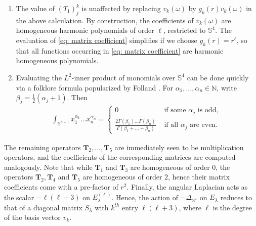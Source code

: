 \documentclass[11pt,reqno]{amsart}
\theoremstyle{remark}
\theoremstyle{definition}
\begin{document}
\begin{enumerate}
    \item The value of $(T_1)^k_j $ is unaffected by replacing $v_k(\omega)$ by $g_k(r) v_k(\omega)$ in the above calculation. By construction, the coefficients of $v_k(\omega)$ are homogeneous harmonic polynomials of order $\ell$, restricted to $\mathbb S^4$. The evaluation of \eqref{eq: matrix coefficient} simplifies if we choose $g_k(r) = r^\ell$, so that all functions occurring in \eqref{eq: matrix coefficient} are harmonic homogeneous polynomials.
    \item Evaluating the $L^2$-inner product of monomials over $\mathbb S^4$ can be done quickly via a folklore formula popularized by Folland \cite{Folland2001}. For $\alpha_1,\ldots,\alpha_n \in \mathbb N$, write $\beta_j = \frac{1}{2}(\alpha_j + 1)$. Then
    \begin{align*}
        \int_{\mathbb S^{n-1}} x_1^{\alpha_1} \ldots x_n^{\alpha_n} = \begin{cases}
            0 & \text{ if some } \alpha_j \text{ is odd, } \\
            \frac{2\Gamma(\beta_1) \ldots \Gamma(\beta_n)}{\Gamma(\beta_1 + \ldots + \beta_n)}& \text{ if all } \alpha_j \text{ are even. }
        \end{cases}
    \end{align*}
\end{enumerate}

The remaining operators $\mathbf T_2,\ldots,\mathbf T_5$ are immediately seen to be multiplication operators, and the coefficients of the corresponding matrices are computed analogously. Note that while $\mathbf T_1$ and $\mathbf T_3$ are homogeneous of order $0$, the operators $\mathbf T_2,\mathbf T_4$ and $\mathbf T_5$ are homogeneous of order $2$, hence their matrix coefficients come with a pre-factor of $r^2$. Finally, the angular Laplacian acts as the scalar $- \ell(\ell+3)$ on $E_\lambda^{(\ell)}$. Hence, the action of $- \Delta_{\mathbb S^4}$ on $E_\lambda$ reduces to that of a diagonal matrix $S_\lambda$ with $k^{th}$ entry $\ell(\ell+3)$, where $\ell$ is the degree of the basis vector $v_k$.
\end{document}
